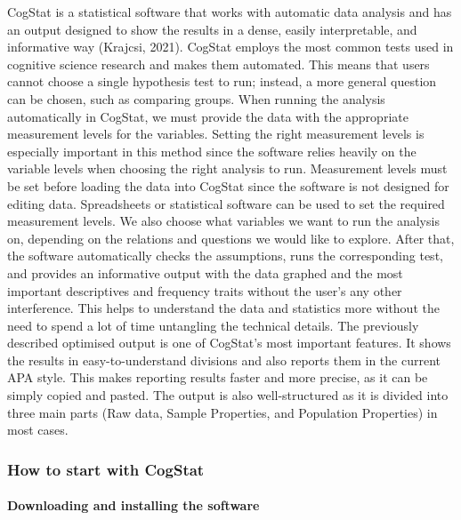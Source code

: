\documentclass[
]{book}
\begin{document}
CogStat is a statistical software that works with automatic data analysis and has an output designed to show the results in a dense, easily interpretable, and informative way (Krajcsi, 2021). CogStat employs the most common tests used in cognitive science research and makes them automated. This means that users cannot choose a single hypothesis test to run; instead, a more general question can be chosen, such as comparing groups. When running the analysis automatically in CogStat, we must provide the data with the appropriate measurement levels for the variables. Setting the right measurement levels is especially important in this method since the software relies heavily on the variable levels when choosing the right analysis to run. Measurement levels must be set before loading the data into CogStat since the software is not designed for editing data. Spreadsheets or statistical software can be used to set the required measurement levels. We also choose what variables we want to run the analysis on, depending on the relations and questions we would like to explore. After that, the software automatically checks the assumptions, runs the corresponding test, and provides an informative output with the data graphed and the most important descriptives and frequency traits without the user's any other interference. This helps to understand the data and statistics more without the need to spend a lot of time untangling the technical details. The previously described optimised output is one of CogStat's most important features. It shows the results in easy-to-understand divisions and also reports them in the current APA style. This makes reporting results faster and more precise, as it can be simply copied and pasted. The output is also well-structured as it is divided into three main parts (Raw data, Sample Properties, and Population Properties) in most cases.

\hypertarget{how-to-start-with-cogstat}{%
\subsubsection{How to start with CogStat}\label{how-to-start-with-cogstat}}

\hypertarget{downloading-and-installing-the-software}{%
\paragraph{Downloading and installing the software}\label{downloading-and-installing-the-software}}
\end{document}
